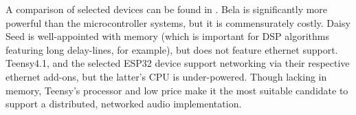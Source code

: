 A comparison of selected devices can be found in
.
Bela is significantly more powerful than the microcontroller systems, but it is
commensurately costly.
Daisy Seed is well-appointed with memory (which is important for DSP algorithms
featuring long delay-lines, for example), but does not feature ethernet support.
Teensy4.1, and the selected ESP32 device support networking via their
respective ethernet add-ons, but the latter's CPU is under-powered.
Though lacking in memory, Teensy's processor and low price make it the most
suitable candidate to support a distributed, networked audio implementation.
